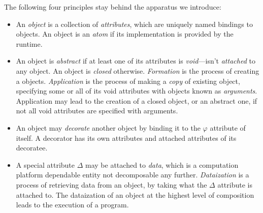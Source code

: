 The following four principles stay behind the
apparatus we introduce:

\begin{itemize}
\item An \emph{object} is a collection of \emph{attributes},
which are uniquely named bindings to objects. An object
is an \emph{atom} if its implementation is provided by the runtime.

\item An object is \emph{abstract} if at least one of its attributes
is \emph{void}---isn't \emph{attached} to any object. An object
is \emph{closed} otherwise.
\emph{Formation} is the process of creating a objects.
\emph{Application} is the process of making a \emph{copy} of existing
object, specifying some or all of its void attributes with
objects known as \emph{arguments}. Application may lead to the
creation of a closed object, or an abstract one, if not all void
attributes are specified with arguments.

\item An object may \emph{decorate} another object by binding it
to the \(\varphi\) attribute of itself. A decorator has its
own attributes and attached attributes of its decoratee.

\item A special attribute \(\Delta\) may be attached to \emph{data},
which is a computation platform dependable entity not
decomposable any further.
\emph{Dataization} is a process of retrieving data from an object,
by taking what the \(\Delta\) attribute is attached to.
The dataization of an object at the highest level of composition
leads to the execution of a program.
\end{itemize}

